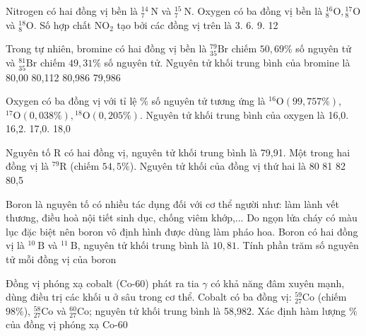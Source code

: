 \begin{ex}[2]
	Nitrogen có hai đồng vị bền là ${ }_7^{14} \mathrm{~N}$ và ${ }_7^{15} \mathrm{~N}$. Oxygen có ba đồng vị bền là ${ }_8^{16} \mathrm{O},{ }_8^{17} \mathrm{O}$ và ${ }_8^{18} \mathrm{O}$. Số hợp chất $\mathrm{NO}_2$ tạo bởi các đồng vị trên là
	\choice
	{ 3.}
	{ 6.}
	{ 9.}
	{ 12}
	\loigiai{%
	}
\end{ex}
\begin{ex}[2]
	Trong tự nhiên, bromine có hai đồng vị bền là ${ }_{35}^{79} \mathrm{Br}$ chiếm $50,69 \%$ số nguyên tử và ${ }_{35}^{81} \mathrm{Br}$ chiếm $49,31 \%$ số nguyên tử. Nguyên tử khối trung bình của bromine là
	\choice
	{ 80,00}
	{ 80,112}
	{ 80,986}
	{ 79,986}
	\loigiai{%
	}
\end{ex}
\begin{ex}[2]
	Oxygen có ba đồng vị với tỉ lệ \% số nguyên tử tương ứng là ${ }^{16} \mathrm{O}(99,757 \%)$, ${ }^{17} \mathrm{O}(0,038 \%),{ }^{18} \mathrm{O}(0,205 \%)$. Nguyên tử khối trung bình của oxygen là
	\choice
	{ 16,0.}
	{ 16,2.}
	{ 17,0.}
	{ 18,0}
	\loigiai{%
	}
\end{ex}
\begin{ex}[2]
	Nguyên tố R có hai đồng vị, nguyên tử khối trung bình là 79,91. Một trong hai đồng vị là ${ }^{79} \mathrm{R}$ (chiếm $54,5 \%$). Nguyên tử khối của đồng vị thứ hai là
	\choice
	{ 80}
	{ 81}
	{ 82}
	{ 80,5}
	\loigiai{%
	}
\end{ex}
\begin{ex}[2]
	Boron là nguyên tố có nhiều tác dụng đối với cơ thể người như: làm lành vết thương, điều hoà nội tiết sinh dục, chống viêm khớp,... Do ngọn lửa cháy có màu lục đặc biệt nên boron vô định hình được dùng làm pháo hoa. Boron có hai đồng vị là ${ }^{10} \mathrm{~B}$ và ${ }^{11} \mathrm{~B}$, nguyên tử khối trung bình là $10,81$. Tính phần trăm số nguyên tử mỗi đồng vị của boron
\loigiai{%
}
\end{ex}
\begin{ex}[2]
Đồng vị phóng xạ cobalt (Co-60) phát ra tia $\gamma$ có khả năng đâm xuyên mạnh, dùng điều trị các khối u ở sâu trong cơ thể. Cobalt có ba đồng vị: ${ }_{27}^{59} \mathrm{Co}$ (chiếm $98 \%$), ${ }_{27}^{58} \mathrm{Co}$ và ${ }_{27}^{60} \mathrm{Co}$; nguyên tử khối trung bình là 58,982. Xác định hàm lượng $\%$ của đồng vị phóng xạ Co-60
\loigiai{%
}
\end{ex}

